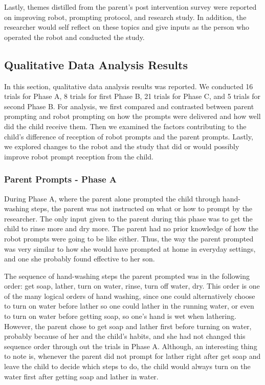 Lastly, themes distilled from the parent's post intervention survey were reported on improving robot, prompting protocol, and research study.  In addition, the researcher would self reflect on these topics and give inputs as the person who operated the robot and conducted the study.

\subsection{Qualitative Data Analysis Results}
\label{sec:QualitativeData_results}
In this section, qualitative data analysis results was reported.  We conducted 16 trials for Phase A, 8 trials for first Phase B, 21 trials for Phase C, and 5 trials for second Phase B.  For analysis, we first compared and contrasted between parent prompting and robot prompting on how the prompts were delivered and how well did the child receive them.  Then we examined the factors contributing to the child's difference of reception of robot prompts and the parent prompts.  Lastly, we explored changes to the robot and the study that did or would possibly improve robot prompt reception from the child.

\subsubsection{Parent Prompts - Phase A}
During Phase A, where the parent alone prompted the child through hand-washing steps, the parent was not instructed on what or how to prompt by the researcher.  The only input given to the parent during this phase was to get the child to rinse more and dry more.  The parent had no prior knowledge of how the robot prompts were going to be like either.  Thus, the way the parent prompted was very similar to how she would have prompted at home in everyday settings, and one she probably found effective to her son.

The sequence of hand-washing steps the parent prompted was in the following order: get soap, lather, turn on water, rinse, turn off water, dry.  This order is one of the many logical orders of hand washing, since one could alternatively choose to turn on water before lather so one could lather in the running water, or even to turn on water before getting soap, so one's hand is wet when lathering.  However, the parent chose to get soap and lather first before turning on water, probably because of her and the child's habits, and she had not changed this sequence order through out the trials in Phase A.  Although, an interesting thing to note is, whenever the parent did not prompt for lather right after get soap and leave the child to decide which steps to do, the child would always turn on the water first after getting soap and lather in water.

